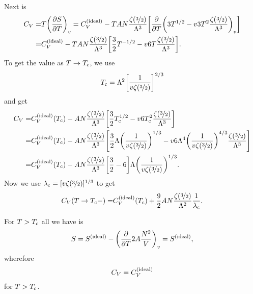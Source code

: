 \documentclass[11pt,letter, swedish, english
]{article}
\begin{document}
Next is
\begin{equation}
\begin{aligned}
C_V=&T\qty(\pdv{S}{T})_v=C_V^\text{{(ideal)}}-TAN
\frac{\zeta(\nicefrac{3}{2})}{\Lambda^3}
\qty[\pdv{T}\qty(3T^{1/2}-v3T^2\frac{\zeta(\nicefrac{3}{2})}{\Lambda^3})_v]\\
=&C_V^\text{{(ideal)}}-TAN
\frac{\zeta(\nicefrac{3}{2})}{\Lambda^3}
\qty[\frac{3}{2}T^{-1/2}-v6T\frac{\zeta(\nicefrac{3}{2})}{\Lambda^3}].\\
\end{aligned}
\end{equation}
To get the value as $T\to T_{\text{c}}$, we use
\begin{equation}
T_{\text{c}}=\Lambda^2\qty[\frac{1}{v\zeta(\nicefrac{3}{2})}]^{2/3}
\end{equation}
and get
\begin{equation}\label{eq:3a_Cv_Tc-}
\begin{aligned}
C_V=&C_V^\text{{(ideal)}}(T_{\text{c}})-AN
\frac{\zeta(\nicefrac{3}{2})}{\Lambda^3}
\qty[\frac{3}{2}T_{\text{c}}^{1/2}-v6T_{\text{c}}^2\frac{\zeta(\nicefrac{3}{2})}{\Lambda^3}]\\
=&C_V^\text{{(ideal)}}(T_{\text{c}})-AN
\frac{\zeta(\nicefrac{3}{2})}{\Lambda^3}
\qty[\frac{3}{2}\Lambda\qty(\frac{1}{v\zeta(\nicefrac{3}{2})})^{1/3}
-v6\Lambda^4\qty(\frac{1}{v\zeta(\nicefrac{3}{2})})^{4/3}
\frac{\zeta(\nicefrac{3}{2})}{\Lambda^3}]\\
=&C_V^\text{{(ideal)}}(T_{\text{c}})-AN
\frac{\zeta(\nicefrac{3}{2})}{\Lambda^3}
\qty[\frac{3}{2}-6]
\Lambda\qty(\frac{1}{v\zeta(\nicefrac{3}{2})})^{1/3}.\\
\end{aligned}
\end{equation}
Now we use $\lambda_{\text{c}}=[v\zeta(\nicefrac{3}{2})]^{1/3}$ to get
\begin{equation}
\begin{aligned}
C_V(T\to T_{\text{c}}-)=&C_V^\text{{(ideal)}}(T_{\text{c}})+\frac{9}{2}AN
\frac{\zeta(\nicefrac{3}{2})}{\Lambda^2}\frac{1}{\lambda_{\text{c}}}.\\
\end{aligned}
\end{equation}

For $T>T_{\text{c}}$ all we have is
\begin{equation}
S=S^\text{{(ideal)}}-\qty(\pdv{T} 2A\frac{N^2}{V})_v
=S^\text{{(ideal)}},
\end{equation}
wherefore 
\begin{equation}
C_V=C_V^\text{{(ideal)}}
\end{equation}
for $T>T_{\text{c}}$.
\end{document}
